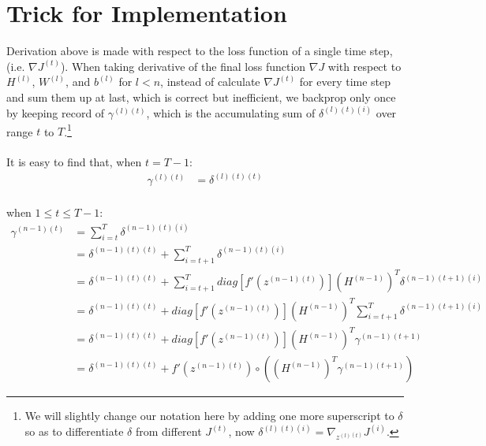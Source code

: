 \documentclass{article}
\begin{document}
	\section{Trick for Implementation}
	Derivation above is made with respect to the loss function of a single time step, (i.e. $\nabla J^{(t)}$). When taking derivative of the final loss function $\nabla J$ with respect to $H^{(l)}$, $W^{(l)}$, and $b^{(l)}$ for $l < n$, instead of calculate $\nabla J^{(t)}$ for every time step and sum them up at last, which is correct but inefficient, we backprop only once by keeping record of $\gamma^{(l)(t)}$, which is the accumulating sum of $\delta^{(l)(t)(i)}$ over range $t$ to $T$.\footnote{We will slightly change our notation here by adding one more superscript to $\delta$ so as to differentiate $\delta$ from different $J^{(t)}$, now $\delta^{(l)(t)(i)} = \nabla_{z^{(l)(t)}}J^{(i)}$.} \\\\
	It is easy to find that, when $t = T-1$:\\
	\begin{equation}
	\begin{aligned}
		\gamma^{(l)(t)} &= \delta^{(l)(t)(t)} \\
	\end{aligned}
	\end{equation}
	
	when $1 \le t \le T-1$:
	\begin{equation}
	\begin{aligned}
		\gamma^{(n-1)(t)} 
		&= \sum_{i=t}^{T} \delta^{(n-1)(t)(i)} \\
		&= \delta^{(n-1)(t)(t)} + \sum_{i=t+1}^{T} \delta^{(n-1)(t)(i)} \\
		&= \delta^{(n-1)(t)(t)} + \sum_{i=t+1}^{T} diag[f'(z^{(n-1)(t)})] (H^{(n-1)})^T \delta^{(n-1)(t+1)(i)}\\
		&= \delta^{(n-1)(t)(t)} + diag[f'(z^{(n-1)(t)})] (H^{(n-1)})^T \sum_{i=t+1}^{T} \delta^{(n-1)(t+1)(i)}\\
		&= \delta^{(n-1)(t)(t)} + diag[f'(z^{(n-1)(t)})] (H^{(n-1)})^T \gamma^{(n-1)(t+1)} \\
		&= \delta^{(n-1)(t)(t)} + f'(z^{(n-1)(t)})\circ ((H^{(n-1)})^T \gamma^{(n-1)(t+1)})
	\end{aligned}
	\end{equation}
	
\end{document}
